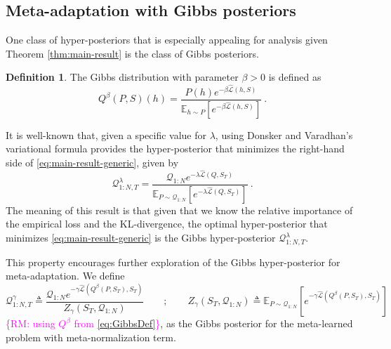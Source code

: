 \documentclass[letterpaper]{article} %
\theoremstyle{definition}
\newtheorem{defn}{Definition}[section]
\newcommand{\Expect}[2]{\mathbb{E}_{#1}\left [#2 \right ]}
\newcommand{\RM}[1]{\textcolor{magenta}{\{RM: #1\}}}
\begin{document}

\subsection{Meta-adaptation with Gibbs posteriors} \label{sec:adapt-gibbs}

One class of hyper-posteriors that is especially appealing for analysis given Theorem \ref{thm:main-result} is the class of Gibbs posteriors.

\begin{defn} \label{defn:Gibbs}
	The Gibbs distribution with parameter $\beta>0$ is defined as 
	\begin{equation}\label{eq:GibbsDef}
	    Q^\beta(P,S)(h)=\frac{P(h)e^{-\beta \hat{\mathcal{L}}(h,S)}}{\Expect{h\sim P}{e^{-\beta\hat{\mathcal{L}}(h,S)}}}~.
	\end{equation}
\end{defn}

It is well-known \citep{Catoni2004} that, given a specific value for $\lambda$, using Donsker and Varadhan’s variational formula \citep{Donsker1975} provides the hyper-posterior that minimizes the right-hand side of \eqref{eq:main-result-generic}, given by
%
\begin{equation*}
    \mathcal{Q}^{\lambda}_{1:N,T}=\frac{\mathcal{Q}_{1:N}e^{-\lambda\hat{\mathcal{L}}(Q,S_T)}}{\Expect{P\sim \mathcal{Q}_{1:N}}{e^{-\lambda\hat{\mathcal{L}}(Q,S_T)}}}~.
\end{equation*}
The meaning of this result is that given that we know the relative importance of the empirical loss and the KL-divergence, the optimal hyper-posterior that minimizes \eqref{eq:main-result-generic} is the Gibbs hyper-posterior $\mathcal{Q}^{\lambda}_{1:N,T}$.

This property encourages further exploration of the Gibbs hyper-posterior for meta-adaptation. We define 
\begin{equation} \label{eq:aml-post-defn}
\mathcal{Q}^{\gamma}_{1:N,T}\triangleq \frac{\mathcal{Q}_{1:N}e^{-\gamma\hat{\mathcal{L}}(Q^\beta(P,S_T),S_T)}}{Z_\gamma(S_T, \mathcal{Q}_{1:N})}\qquad;\qquad Z_\gamma(S_T, \mathcal{Q}_{1:N})\triangleq \Expect{P\sim \mathcal{Q}_{1:N}}{e^{-\gamma\hat{\mathcal{L}}(Q^\beta(P,S_T),S_T)}}
\end{equation} 
\RM{using $Q^\beta$ from \eqref{eq:GibbsDef}}, as the Gibbs posterior for the meta-learned problem with meta-normalization term. 
\end{document}
